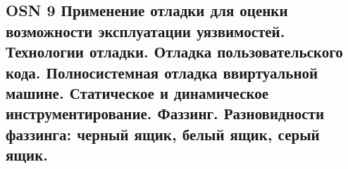 \subsection{OSN 9 Применение отладки для оценки возможности эксплуатации уязвимостей. Технологии отладки. Отладка пользовательского кода. Полносистемная отладка ввиртуальной машине. Статическое и динамическое инструментирование. Фаззинг. Разновидности фаззинга: черный ящик, белый ящик, серый ящик.}
